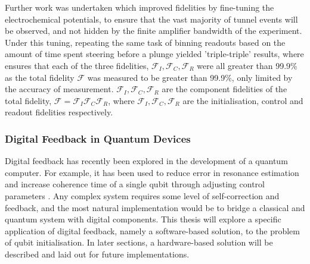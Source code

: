 	Further work was undertaken which improved fidelities by fine-tuning the electrochemical potentials, to ensure that the vast majority of tunnel events will be observed, and not hidden by the finite amplifier bandwidth of the experiment. Under this tuning, repeating the same task of binning readouts based on the amount of time spent steering before a plunge yielded 'triple-triple' results, where ensures that each of the three fidelities, $\mathcal{F}_I, \mathcal{F}_C, \mathcal{F}_R$ were all greater than 99.9\% as the total fidelity $\mathcal{F}$ was measured to be greater than 99.9\%, only limited by the accuracy of measurement. $\mathcal{F}_I, \mathcal{F}_C, \mathcal{F}_R$ are the component fidelities of the total fidelity, $\mathcal{F} = \mathcal{F}_I \mathcal{F}_C \mathcal{F}_R$, where $\mathcal{F}_I, \mathcal{F}_C, \mathcal{F}_R$ are the initialisation, control and readout fidelities respectively.

\subsubsection{Digital Feedback in Quantum Devices}

	Digital feedback has recently been explored in the development of a quantum computer. For example, it has been used to reduce error in resonance estimation \cite{bonato2015optimized} and increase coherence time of a single qubit through adjusting control parameters \cite{shulman2014suppressing}. Any complex system requires some level of self-correction and feedback, and the most natural implementation would be to bridge a classical and quantum system with digital components. This thesis will explore a specific application of digital feedback, namely a software-based solution, to the problem of qubit initialisation. In later sections, a hardware-based solution will be described and laid out for future implementations.
